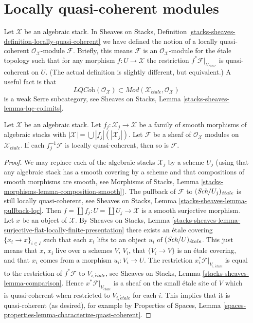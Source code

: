 \section{Locally quasi-coherent modules}
\label{section-locally-quasi-coherent}

\noindent
Let $\mathcal{X}$ be an algebraic stack. In
Sheaves on Stacks, Definition
\ref{stacks-sheaves-definition-locally-quasi-coherent}
we have defined the notion of a locally quasi-coherent
$\mathcal{O}_\mathcal{X}$-module $\mathcal{F}$. Briefly, this means
$\mathcal{F}$ is an $\mathcal{O}_\mathcal{X}$-module for the
\'etale topology such that for any morphism $f : U \to \mathcal{X}$
the restriction $f^*\mathcal{F}|_{U_{\acute{e}tale}}$ is quasi-coherent
on $U$. (The actual definition is slightly different, but equivalent.)
A useful fact is that
$$
\textit{LQCoh}(\mathcal{O}_\mathcal{X}) \subset
\textit{Mod}(\mathcal{X}_{\acute{e}tale}, \mathcal{O}_\mathcal{X})
$$
is a weak Serre subcategory, see
Sheaves on Stacks, Lemma \ref{stacks-sheaves-lemma-lqc-colimits}.

\begin{lemma}
\label{lemma-check-lqc-on-etale-covering}
Let $\mathcal{X}$ be an algebraic stack. Let
$f_j : \mathcal{X}_j \to \mathcal{X}$ be a family of smooth
morphisms of algebraic stacks with
$|\mathcal{X}| =\bigcup |f_j|(|\mathcal{X}_j|)$.
Let $\mathcal{F}$ be a sheaf of $\mathcal{O}_\mathcal{X}$ modules
on $\mathcal{X}_{\acute{e}tale}$. If each $f_j^{-1}\mathcal{F}$
is locally quasi-coherent, then so is $\mathcal{F}$.
\end{lemma}

\begin{proof}
We may replace each of the algebraic stacks $\mathcal{X}_j$ by
a scheme $U_j$ (using that any algebraic stack has a smooth covering by
a scheme and that compositions of smooth morphisms are smooth, see
Morphisms of Stacks, Lemma \ref{stacks-morphisms-lemma-composition-smooth}).
The pullback of $\mathcal{F}$ to $(\textit{Sch}/U_j)_{\acute{e}tale}$ is still
locally quasi-coherent, see
Sheaves on Stacks, Lemma \ref{stacks-sheaves-lemma-pullback-lqc}.
Then $f = \coprod f_j : U = \coprod U_j \to \mathcal{X}$ is a smooth surjective
morphism. Let $x$ be an object of $\mathcal{X}$. By
Sheaves on Stacks, Lemma
\ref{stacks-sheaves-lemma-surjective-flat-locally-finite-presentation}
there exists an \'etale covering $\{x_i \to x\}_{i \in I}$
such that each $x_i$ lifts to an object $u_i$ of $(\textit{Sch}/U)_{\acute{e}tale}$.
This just means that $x$, $x_i$ live over a schemes $V$, $V_i$, that
$\{V_i \to V\}$ is an \'etale covering, and that $x_i$ comes from
a morphism $u_i : V_i \to U$. The restriction
$x_i^*\mathcal{F}|_{V_{i, \acute{e}tale}}$ is equal to the restriction
of $f^*\mathcal{F}$ to $V_{i, \acute{e}tale}$, see
Sheaves on Stacks, Lemma \ref{stacks-sheaves-lemma-comparison}.
Hence $x^*\mathcal{F}|_{V_{\acute{e}tale}}$
is a sheaf on the small \'etale site of $V$ which is quasi-coherent
when restricted to $V_{i, \acute{e}tale}$ for each $i$.
This implies that it is quasi-coherent (as desired), for example by
Properties of Spaces, Lemma
\ref{spaces-properties-lemma-characterize-quasi-coherent}.
\end{proof}

